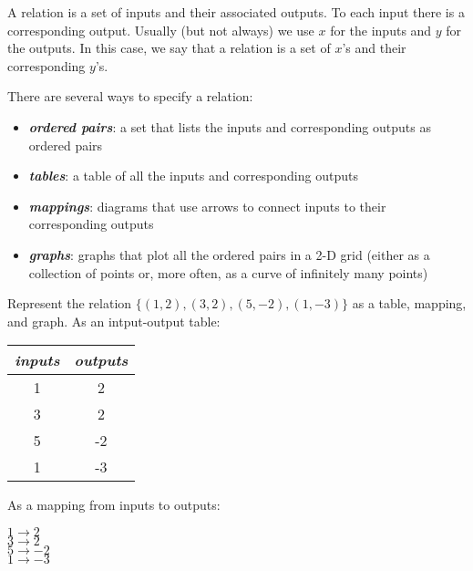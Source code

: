 \documentclass[fleqn,letterpaper,12pt,printwatermark=false]{memoir}
\begin{document}
\begin{myLesson}[][1]
    A relation is a set of inputs and their associated outputs.
    To each input there is a corresponding output.
    Usually (but not always) we use $x$ for the inputs
    and $y$ for the outputs.
    In this case, we say that a relation is 
    a set of $x$'s and their corresponding $y$'s.

    There are several ways to specify a relation:
    \begin{itemize}
        \item {\bfseries\itshape ordered pairs}: 
        a set that lists the inputs and corresponding outputs as ordered pairs
        \item {\bfseries\itshape tables}: 
        a table of all the inputs and corresponding outputs
        \item {\bfseries\itshape mappings}: 
        diagrams that use arrows to connect inputs to their corresponding outputs
        \item {\bfseries\itshape graphs}: 
        graphs that plot all the ordered pairs in a 2-D grid 
        (either as a collection of points or, more often, as a curve of infinitely many points)
    \end{itemize}

    \begin{myWorkedExample}{
            Represent the relation
            \(
                \{ (1,2), (3,2), (5,-2), (1,-3) \}
            \)
            as a table, mapping, and graph.
        }
        As an intput-output table:

        \begin{center}
        \begin{tabular}{cc}
            \toprule
            \emph{inputs} & \emph{outputs} \\
            \midrule
            1 & 2\\
            3 & 2\\
            5 & -2\\
            1 & -3\\
            \bottomrule
        \end{tabular}
        \end{center}

        As a mapping from inputs to outputs:

        \begin{center}
            \(
                1 \longrightarrow 2
            \)\\
            \(
                3 \longrightarrow 2
            \)\\
            \(
                5 \longrightarrow -2
            \)\\
            \(
                1 \longrightarrow -3
            \)
        \end{center}
    

\end{myWorkedExample}
\end{myLesson}
\end{document}

